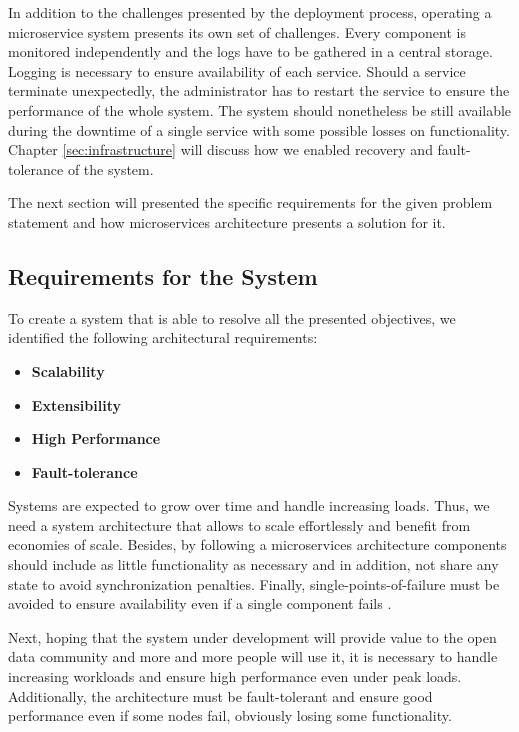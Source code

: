 In addition to the challenges presented by the deployment process,
operating a microservice system presents its own set of challenges.
Every component is monitored independently and the logs have to be
gathered in a central storage. Logging is necessary to ensure
availability of each service. Should a service terminate unexpectedly,
the administrator has to restart the service to ensure the performance
of the whole system. The system should nonetheless be still available during
the downtime of a single service with some possible losses on
functionality. Chapter \ref{sec:infrastructure} will discuss how
we enabled recovery and fault-tolerance of the system.

The next section will presented the specific requirements for the given
problem statement and how microservices architecture presents a solution
for it.

\subsection{Requirements for the System}\label{requirements-of-the-whole-platform}

To create a system that is able to resolve all the presented objectives,
we identified the following architectural requirements:

\begin{itemize}
\tightlist
\item
  \textbf{Scalability}
\item
  \textbf{Extensibility}
\item
  \textbf{High Performance}
\item
  \textbf{Fault-tolerance}
\end{itemize}

Systems are expected to grow over time and handle increasing loads. Thus,
we need a system architecture that allows to scale effortlessly and
benefit from economies of scale. Besides, by following a microservices
architecture components should include as little functionality as
necessary and in addition, not share any state to avoid synchronization penalties.
Finally, single-points-of-failure must be avoided to ensure availability
even if a single component fails \cite{Chatzakis.2016}.

Next, hoping that the system under development will provide value to
the open data community and more and more people will use it, it is necessary to
handle increasing workloads and ensure high performance even under peak
loads. Additionally, the architecture must be fault-tolerant and ensure
good performance even if some nodes fail, obviously losing some functionality.

